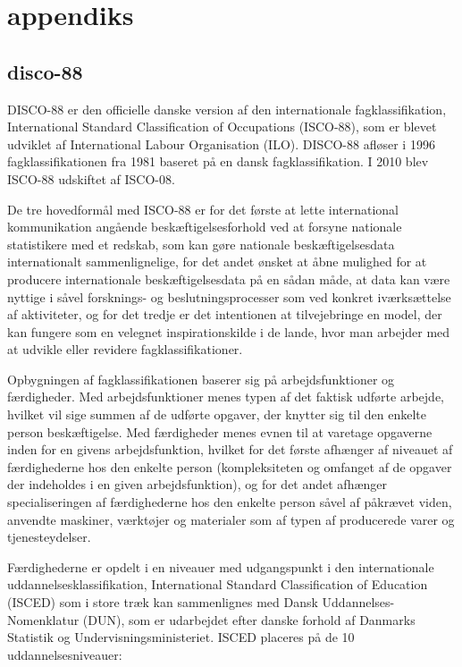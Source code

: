 
\chapter{appendiks} \label{appendiks}


\section{disco-88 \label{}}

DISCO-88 er den officielle danske version af den internationale fagklassifikation, International Standard Classification of Occupations (ISCO-88), som er blevet udviklet af International Labour Organisation (ILO). DISCO-88 afløser i 1996 fagklassifikationen fra 1981 baseret på en dansk fagklassifikation. I 2010 blev ISCO-88 udskiftet af ISCO-08.

De tre hovedformål med ISCO-88 er for det første at lette international kommunikation angående
beskæftigelsesforhold ved at forsyne nationale statistikere med et redskab, som kan
gøre nationale beskæftigelsesdata internationalt sammenlignelige, for det andet ønsket at åbne mulighed for at producere internationale beskæftigelsesdata på en sådan måde, at data kan være nyttige i såvel forsknings- og beslutningsprocesser som ved konkret iværksættelse af aktiviteter, og for det tredje er det intentionen at tilvejebringe en model, der kan fungere som en
velegnet inspirationskilde i de lande, hvor man arbejder med at udvikle eller revidere
fagklassifikationer.

Opbygningen af fagklassifikationen baserer sig på arbejdsfunktioner og færdigheder. Med arbejdsfunktioner menes typen af det faktisk udførte arbejde, hvilket vil sige summen af de udførte opgaver, der knytter sig til den enkelte person beskæftigelse. 
Med færdigheder menes evnen til at varetage opgaverne inden for en givens arbejdsfunktion, hvilket for det første afhænger af niveauet af færdighederne hos den enkelte person (kompleksiteten og omfanget af de opgaver der indeholdes i en given arbejdsfunktion), og for det andet afhænger specialiseringen af færdighederne hos den enkelte person såvel af påkrævet viden, anvendte maskiner, værktøjer og materialer som af typen af producerede varer og tjenesteydelser.

Færdighederne er opdelt i en niveauer med udgangspunkt i den internationale uddannelsesklassifikation, International Standard Classification of Education (ISCED) som i store træk kan sammenlignes med Dansk Uddannelses-Nomenklatur (DUN), som er udarbejdet efter danske forhold af Danmarks Statistik og Undervisningsministeriet. ISCED placeres på de 10 uddannelsesniveauer:

